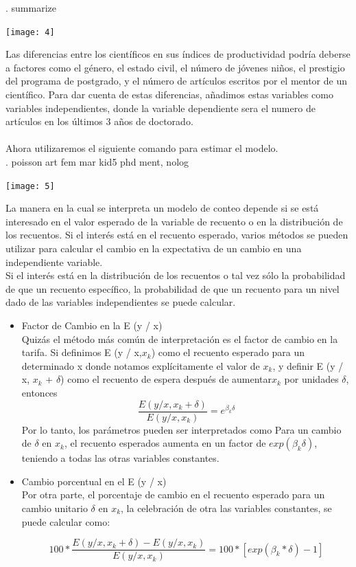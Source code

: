\documentclass[11pt,fleqn]{book} %
\numberwithin{equation}{section} %
\numberwithin{figure}{section} %
\numberwithin{table}{section} %
\begin{document}
. summarize\\

\begin{center}
\texttt{[image: 4]}
\end{center}

Las diferencias entre los científicos en sus índices de productividad podría deberse a factores como el género, el estado civil, el número de jóvenes niños, el prestigio del programa de postgrado, y el número de artículos escritos por el mentor de un científico. Para dar cuenta de estas diferencias, añadimos estas variables como variables independientes, donde la variable dependiente sera el numero de artículos en los  últimos 3 años de doctorado.
\\\\
Ahora utilizaremos el siguiente comando para estimar el modelo.\\
. poisson art fem mar kid5 phd ment, nolog\\

\begin{center}
\texttt{[image: 5]}
\end{center}

La manera  en la cual se interpreta  un modelo de conteo depende si se está interesado en el valor esperado de la variable de recuento o en la distribución de los recuentos. Si el interés está en el recuento esperado, varios métodos se pueden utilizar para calcular el cambio en la expectativa de un cambio en una independiente variable.
\\
Si el interés está en la distribución de los recuentos o tal vez sólo la probabilidad de que un recuento específico, la probabilidad de que un recuento para un nivel dado de las variables independientes se puede calcular.
\begin{itemize}
 \item Factor de Cambio en la E (y / x)\\
Quizás el método más común de interpretación es el factor de cambio en la tarifa. Si definimos
E (y / x,$ x_{k}$) como el recuento esperado para un determinado x donde notamos explícitamente el valor de $x_{k}$, y definir E (y / x, $x_{k}$ + $\delta$) como el recuento de espera después de aumentar$ x_{k}$ por unidades $\delta$, entonces
\begin{equation}
\frac{E (y / x, x_{k}+ \delta)}{E (y / x, x_{k})}=e^{\beta_{k}\delta}
\end{equation}
Por lo tanto, los parámetros pueden ser interpretados como
Para un cambio de $\delta$ en $x_{k}$, el recuento esperados aumenta en un factor de $exp(\beta_{k}\delta)$, teniendo a  todas las otras variables constantes.
 \item Cambio porcentual en el E (y / x)\\
Por otra parte, el porcentaje de cambio en el recuento esperado para un cambio unitario $\delta$ en  $x_{k}$, la celebración de otra las variables constantes, se puede calcular como:

\begin{equation}
100*\frac{E (y / x, x_{k}+ \delta)-E (y / x, x_{k})}{E (y / x, x_{k})}= 100*[exp (\beta_{k}*\delta) - 1]
\end{equation}
\end{itemize}
\end{document}
